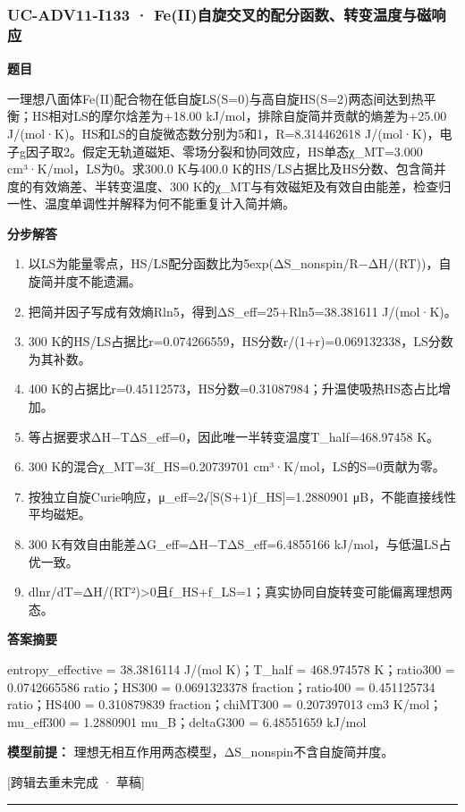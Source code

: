 \documentclass[UTF8,11pt,a4paper]{ctexart}
\begin{document}
\subsubsection*{UC-ADV11-I133 · Fe(II)自旋交叉的配分函数、转变温度与磁响应}
\noindent\textbf{题目}\par
一理想八面体Fe(II)配合物在低自旋LS(S=0)与高自旋HS(S=2)两态间达到热平衡；HS相对LS的摩尔焓差为+18.00 kJ/mol，排除自旋简并贡献的熵差为+25.00 J/(mol·K)。HS和LS的自旋微态数分别为5和1，R=8.314462618 J/(mol·K)，电子g因子取2。假定无轨道磁矩、零场分裂和协同效应，HS单态χ\_MT=3.000 cm³·K/mol，LS为0。求300.0 K与400.0 K的HS/LS占据比及HS分数、包含简并度的有效熵差、半转变温度、300 K的χ\_MT与有效磁矩及有效自由能差，检查归一性、温度单调性并解释为何不能重复计入简并熵。\par
\medskip\noindent\textbf{分步解答}
\begin{enumerate}
\item 以LS为能量零点，HS/LS配分函数比为5exp(ΔS\_nonspin/R−ΔH/(RT))，自旋简并度不能遗漏。
\item 把简并因子写成有效熵Rln5，得到ΔS\_eff=25+Rln5=38.381611 J/(mol·K)。
\item 300 K的HS/LS占据比r=0.074266559，HS分数r/(1+r)=0.069132338，LS分数为其补数。
\item 400 K的占据比r=0.45112573，HS分数=0.31087984；升温使吸热HS态占比增加。
\item 等占据要求ΔH−TΔS\_eff=0，因此唯一半转变温度T\_half=468.97458 K。
\item 300 K的混合χ\_MT=3f\_HS=0.20739701 cm³·K/mol，LS的S=0贡献为零。
\item 按独立自旋Curie响应，μ\_eff=2√[S(S+1)f\_HS]=1.2880901 μB，不能直接线性平均磁矩。
\item 300 K有效自由能差ΔG\_eff=ΔH−TΔS\_eff=6.4855166 kJ/mol，与低温LS占优一致。
\item dlnr/dT=ΔH/(RT²)>0且f\_HS+f\_LS=1；真实协同自旋转变可能偏离理想两态。
\end{enumerate}
\noindent\textbf{答案摘要}\par
entropy\_effective = 38.3816114 J/(mol K)；T\_half = 468.974578 K；ratio300 = 0.0742665586 ratio；HS300 = 0.0691323378 fraction；ratio400 = 0.451125734 ratio；HS400 = 0.310879839 fraction；chiMT300 = 0.207397013 cm3 K/mol；mu\_eff300 = 1.2880901 mu\_B；deltaG300 = 6.48551659 kJ/mol\par
\noindent\textbf{模型前提：}
理想无相互作用两态模型，ΔS\_nonspin不含自旋简并度。\par
\noindent\textcolor{red!65!black}{[跨辑去重未完成 · 草稿]} \par
\medskip\hrule\medskip
{}
\end{document}
